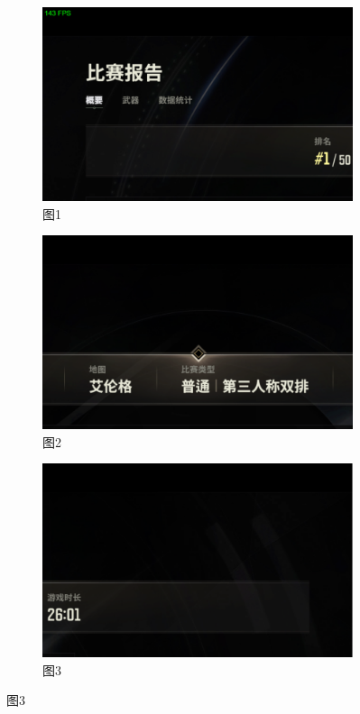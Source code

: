 \documentclass[12pt, a4paper, oneside]{ctexart}
\begin{document}
\begin{figure}[htbp]
    \centering
    \begin{subfigure}{0.3\textwidth}
        \centering
        \includegraphics[width=\textwidth]{fig/1.png} %
        \caption{图1}
    \end{subfigure}
    \hfill
    \begin{subfigure}{0.3\textwidth}
        \centering
        \includegraphics[width=\textwidth]{fig/2.png} %
        \caption{图2}
    \end{subfigure}
    \hfill
    \begin{subfigure}{0.3\textwidth}
        \centering
        \includegraphics[width=\textwidth]{fig/3.png} %
        \caption{图3}
    \end{subfigure}


\end{figure}
\end{document}

